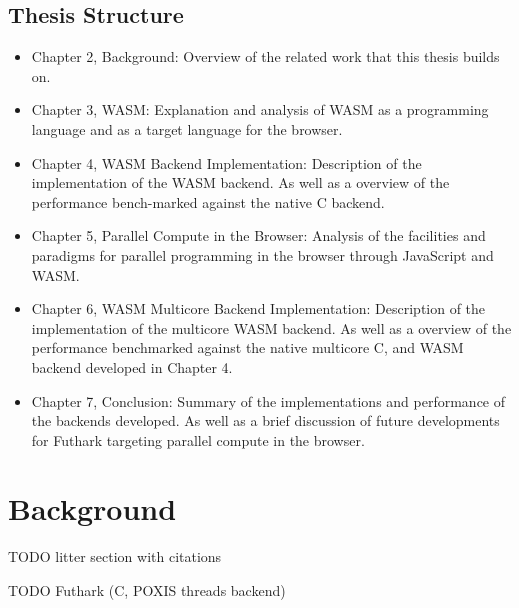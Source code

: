\documentclass[11pt]{book}
\begin{document}
\section{Thesis Structure}
\begin{itemize}
    \item Chapter 2, Background:
    Overview of the related work that this thesis builds on.
    \item Chapter 3, WASM:
    Explanation and analysis of WASM as a programming language and as a target language for the browser. 
    
    \item Chapter 4, WASM  Backend Implementation:
     Description of the implementation of the WASM backend. As well as a overview of the performance bench-marked against the native C backend.
    
    \item Chapter 5, Parallel Compute in the Browser:
    Analysis of the facilities and paradigms for parallel programming in the browser through JavaScript and WASM. 
    
    \item Chapter 6, WASM Multicore Backend Implementation:
    Description of the implementation of the multicore WASM backend. As well as a overview of the performance benchmarked against the native multicore C, and WASM backend developed in Chapter 4.
    
    \item Chapter 7, Conclusion:
    Summary of the implementations and performance of the backends developed. As well as a brief discussion of future developments for Futhark targeting parallel compute in the browser.
    
\end{itemize}

\chapter{Background}

TODO litter section with citations


TODO Futhark (C, POXIS threads backend)


\end{document}
